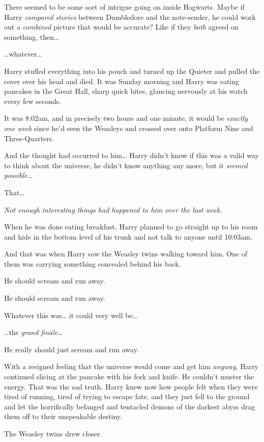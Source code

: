 There seemed to be some sort of intrigue going on inside Hogwarts. Maybe if
Harry \emph{compared stories} between Dumbledore and the note-sender, he could
work out a \emph{combined} picture that would be accurate? Like if they
\emph{both} agreed on something, then{\ldots}

{\ldots}whatever{\ldots}

Harry stuffed everything into his pouch and turned up the Quieter and pulled
the cover over his head and died.
\sbreak
It was Sunday morning and Harry was eating pancakes in the Great Hall, sharp
quick bites, glancing nervously at his watch every few seconds.

It was 8:02am, and in precisely two hours and one minute, it would be
\emph{exactly one week} since he'd seen the Weasleys and crossed over onto
Platform Nine and Three-Quarters.

And the thought had occurred to him{\ldots} Harry didn't know if this was a
valid way to think about the universe, he didn't know anything any more, but it
\emph{seemed possible{\ldots}}

That{\ldots}

\emph{Not enough interesting things had happened to him over the last week.}

When he was done eating breakfast, Harry planned to go straight up to his room
and hide in the bottom level of his trunk and not talk to anyone until 10:03am.

And that was when Harry saw the Weasley twins walking toward him. One of them
was carrying something concealed behind his back.

He should scream and run away.

He should scream and run away.

Whatever this was{\ldots} it could very well be{\ldots}

{\ldots}the \emph{grand finale{\ldots}}

He really should just scream and run away.

With a resigned feeling that the universe would come and get him \emph{anyway},
Harry continued slicing at the pancake with his fork and knife. He couldn't
muster the energy. That was the sad truth. Harry knew now how people felt when
they were tired of running, tired of trying to escape fate, and they just fell
to the ground and let the horrifically befanged and tentacled demons of the
darkest abyss drag them off to their unspeakable destiny.

The Weasley twins drew closer.


